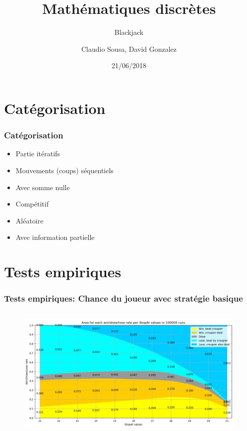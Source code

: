 \documentclass{beamer}
\title[]{Mathématiques discrètes}
\subtitle{Blackjack}
\author{Claudio Sousa, David Gonzalez}
\institute{HEPIA}
\date{21/06/2018}
\begin{document}
\begin{frame}[plain]
    \titlepage
\end{frame}

\section{Catégorisation}

\begin{frame}
    \frametitle{Catégorisation}
    \begin{itemize}
        \item Partie itératifs
        \item Mouvements (coups) séquentiels
        \item Avec somme nulle
        \item Compétitif
        \item Aléatoire
        \item Avec information partielle
    \end{itemize}
\end{frame}

\section{Tests empiriques}

\begin{frame}
    \frametitle{Tests empiriques: Chance du joueur avec stratégie basique}
    \begin{columns}
        \column{\dimexpr\paperwidth-1pt}
        \begin{figure}[H]
            \begin{center}
                \includegraphics[width=1\textwidth]{empirical_graph1}
            \end{center}
        \end{figure}
    \end{columns}
\end{frame}
\end{document}
